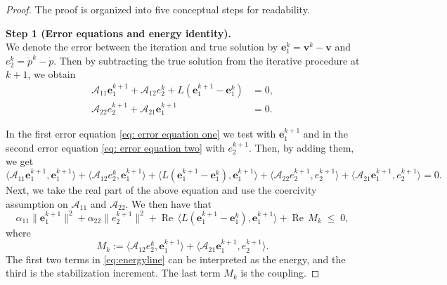 \documentclass[pdflatex,sn-mathphys-num]{sn-jnl}
\theoremstyle{thmstyleone}%
\theoremstyle{thmstyletwo}%
\theoremstyle{thmstylethree}%
\def \bmv {\bm{v}}
\newcommand{\ip}[2]{\langle #1, #2\rangle}
\newcommand{\Ree}{\operatorname{Re}}
\theoremstyle{definition}
\begin{document}
	
	\begin{proof}[Proof] 
		The proof is organized into five conceptual steps for readability.
		

		\noindent\textbf{Step 1 (Error equations and energy identity).} \\
		We denote the error between the iteration and true solution by $\bm{e}_{1}^{k}=\bmv^{k}-\bmv$ and $e^{k}_2=\dot{p}^{k}-\dot{p}$. Then by subtracting the true solution from the iterative procedure at $k+1$, we obtain
		\begin{subequations}
			\begin{align}
				\mathcal{A}_{11}\bm{e}_{1}^{k+1}+\mathcal{A}_{12}e_2^k+L(\bm{e}_{1}^{k+1}-\bm{e}_{1}^{k})&=0,\label{eq: error equation one}\\
				\mathcal{A}_{22}e_2^{k+1}+\mathcal{A}_{21}\bm{e}_{1}^{k+1}&=0.\label{eq: error equation two}
			\end{align}
		\end{subequations}
		
		In the first error equation \eqref{eq: error equation one} we test with $\mathbf{e}_1^{k+1}$ and in the second error equation \eqref{eq: error equation two} with $e_2^{k+1}$. Then, by adding them, we get
		\[
		\ip{\mathcal{A}_{11}\mathbf{e}_1^{k+1}}{\mathbf{e}_1^{k+1}}
		+ \ip{\mathcal{A}_{12} e_2^{k}}{\mathbf{e}_1^{k+1}}
		+ \ip{L(\mathbf{e}_1^{k+1}-\mathbf{e}_1^{k})}{\mathbf{e}_1^{k+1}}
		+ \ip{\mathcal{A}_{22}e_2^{k+1}}{e_2^{k+1}}
		+ \ip{\mathcal{A}_{21}\mathbf{e}_1^{k+1}}{e_2^{k+1}}=0.
		\]
		Next, we take the real part of the above equation and use the coercivity assumption on $\mathcal{A}_{11}$ and $\mathcal{A}_{22}$. We then have that 
		\begin{equation}\label{eq:energyline}
			\alpha_{11}\|\mathbf{e}_1^{k+1}\|^2 + \alpha_{22}\|e_2^{k+1}\|^2
			+ \Ree\,\ip{L(\mathbf{e}_1^{k+1}-\mathbf{e}_1^{k})}{\mathbf{e}_1^{k+1}}
			+ \Ree\,M_k \;\le\; 0,
		\end{equation}
		where
		\begin{equation}\label{eq: Mk}
			M_k := \ip{\mathcal{A}_{12} e_2^{k}}{\mathbf{e}_1^{k+1}} + \ip{\mathcal{A}_{21}\mathbf{e}_1^{k+1}}{e_2^{k+1}}.
		\end{equation}
		The first two terms in \eqref{eq:energyline} can be interpreted as the energy, and the third is the stabilization increment. The last term $M_k$ is the coupling.
	

\end{proof}
\end{document}

